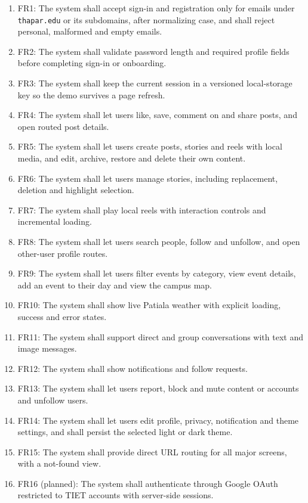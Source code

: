 \documentclass{scrreprt}
\begin{document}
\begin{enumerate}
    \item FR1: The system shall accept sign-in and registration only for emails under \texttt{thapar.edu} or its subdomains, after normalizing case, and shall reject personal, malformed and empty emails.
    \item FR2: The system shall validate password length and required profile fields before completing sign-in or onboarding.
    \item FR3: The system shall keep the current session in a versioned local-storage key so the demo survives a page refresh.
    \item FR4: The system shall let users like, save, comment on and share posts, and open routed post details.
    \item FR5: The system shall let users create posts, stories and reels with local media, and edit, archive, restore and delete their own content.
    \item FR6: The system shall let users manage stories, including replacement, deletion and highlight selection.
    \item FR7: The system shall play local reels with interaction controls and incremental loading.
    \item FR8: The system shall let users search people, follow and unfollow, and open other-user profile routes.
    \item FR9: The system shall let users filter events by category, view event details, add an event to their day and view the campus map.
    \item FR10: The system shall show live Patiala weather with explicit loading, success and error states.
    \item FR11: The system shall support direct and group conversations with text and image messages.
    \item FR12: The system shall show notifications and follow requests.
    \item FR13: The system shall let users report, block and mute content or accounts and unfollow users.
    \item FR14: The system shall let users edit profile, privacy, notification and theme settings, and shall persist the selected light or dark theme.
    \item FR15: The system shall provide direct URL routing for all major screens, with a not-found view.
    \item FR16 (planned): The system shall authenticate through Google OAuth restricted to TIET accounts with server-side sessions.

\end{enumerate}
\end{document}
